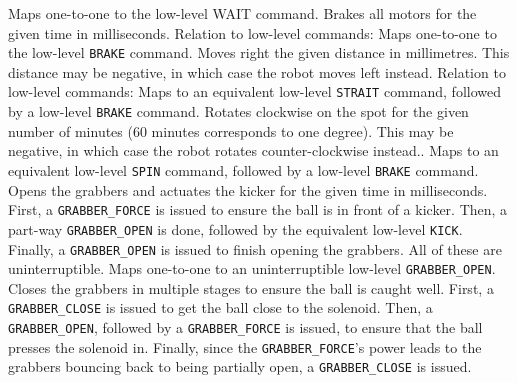     {Maps one-to-one to the low-level WAIT command.}
    {Brakes all motors for the given time in milliseconds.}
    {Relation to low-level commands: Maps one-to-one to the low-level
     \texttt{BRAKE} command.}
    {Moves right the given distance in millimetres. This distance may be
     negative, in which case the robot moves left instead.}
    {Relation to low-level commands: Maps to an equivalent low-level
     \texttt{STRAIT} command, followed by a low-level \texttt{BRAKE} command.}
    {Rotates clockwise on the spot for the given number of minutes (60 minutes
     corresponds to one degree). This may be negative, in which case the robot
     rotates counter-clockwise instead..}
    {Maps to an equivalent low-level \texttt{SPIN} command, followed by a
     low-level \texttt{BRAKE} command.}
    {Opens the grabbers and actuates the kicker for the given time in
     milliseconds.}
    {First, a \texttt{GRABBER\_FORCE} is issued to ensure the ball is in front
     of a kicker. Then, a part-way \texttt{GRABBER\_OPEN} is done, followed by
     the equivalent low-level \texttt{KICK}. Finally, a \texttt{GRABBER\_OPEN}
     is issued to finish opening the grabbers. All of these are
     uninterruptible.}
    {Maps one-to-one to an uninterruptible low-level \texttt{GRABBER\_OPEN}.}
    {Closes the grabbers in multiple stages to ensure the ball is caught well.}
    {First, a \texttt{GRABBER\_CLOSE} is issued to get the ball close to the
     solenoid.  Then, a \texttt{GRABBER\_OPEN}, followed by a
     \texttt{GRABBER\_FORCE} is issued, to ensure that the ball presses the
     solenoid in. Finally, since the \texttt{GRABBER\_FORCE}'s power leads to
     the grabbers bouncing back to being partially open, a
     \texttt{GRABBER\_CLOSE} is issued.}
